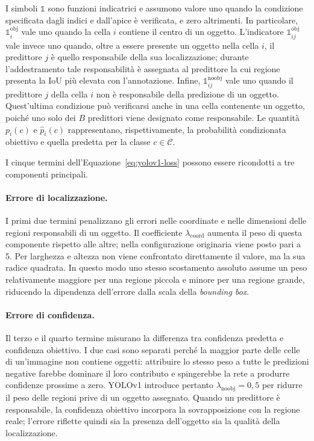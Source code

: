 I simboli $\mathbb{1}$ sono funzioni indicatrici e assumono valore uno quando la condizione specificata dagli indici e dall'apice è verificata, e zero altrimenti. In particolare, $\mathbb{1}_{i}^{\mathrm{obj}}$ vale uno quando la cella $i$ contiene il centro di un oggetto. L'indicatore $\mathbb{1}_{ij}^{\mathrm{obj}}$ vale invece uno quando, oltre a essere presente un oggetto nella cella $i$, il predittore $j$ è quello responsabile della sua localizzazione; durante l'addestramento tale responsabilità è assegnata al predittore la cui regione presenta la IoU più elevata con l'annotazione. Infine, $\mathbb{1}_{ij}^{\mathrm{noobj}}$ vale uno quando il predittore $j$ della cella $i$ non è responsabile della predizione di un oggetto. Quest'ultima condizione può verificarsi anche in una cella contenente un oggetto, poiché uno solo dei $B$ predittori viene designato come responsabile. Le quantità $p_i(c)$ e $\hat{p}_i(c)$ rappresentano, rispettivamente, la probabilità condizionata obiettivo e quella predetta per la classe $c\in\mathcal{C}$.

I cinque termini dell'Equazione~\ref{eq:yolov1-loss} possono essere ricondotti a tre componenti principali.

\paragraph{Errore di localizzazione.}
I primi due termini penalizzano gli errori nelle coordinate e nelle dimensioni delle regioni responsabili di un oggetto. Il coefficiente $\lambda_{\mathrm{coord}}$ aumenta il peso di questa componente rispetto alle altre; nella configurazione originaria viene posto pari a 5. Per larghezza e altezza non viene confrontato direttamente il valore, ma la sua radice quadrata. In questo modo uno stesso scostamento assoluto assume un peso relativamente maggiore per una regione piccola e minore per una regione grande, riducendo la dipendenza dell'errore dalla scala della \textit{bounding box}.

\paragraph{Errore di confidenza.}
Il terzo e il quarto termine misurano la differenza tra confidenza predetta e confidenza obiettivo. I due casi sono separati perché la maggior parte delle celle di un'immagine non contiene oggetti: attribuire lo stesso peso a tutte le predizioni negative farebbe dominare il loro contributo e spingerebbe la rete a produrre confidenze prossime a zero. YOLOv1 introduce pertanto $\lambda_{\mathrm{noobj}}=0{,}5$ per ridurre il peso delle regioni prive di un oggetto assegnato. Quando un predittore è responsabile, la confidenza obiettivo incorpora la sovrapposizione con la regione reale; l'errore riflette quindi sia la presenza dell'oggetto sia la qualità della localizzazione.

